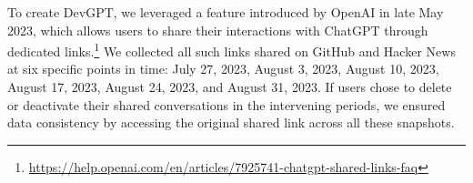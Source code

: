 \documentclass[10pt,conference]{IEEEtran}
\begin{document}

To create DevGPT, we leveraged a feature introduced by OpenAI in late May 2023, which allows users to share their interactions with ChatGPT through dedicated links.\footnote{\url{https://help.openai.com/en/articles/7925741-chatgpt-shared-links-faq}} We collected all such links shared on GitHub and Hacker News at six specific points in time: July 27, 2023, August 3, 2023, August 10, 2023, August 17, 2023, August 24, 2023, and August 31, 2023. If users chose to delete or deactivate their shared conversations in the intervening periods, we ensured data consistency by accessing the original shared link across all these snapshots.


\end{document}
